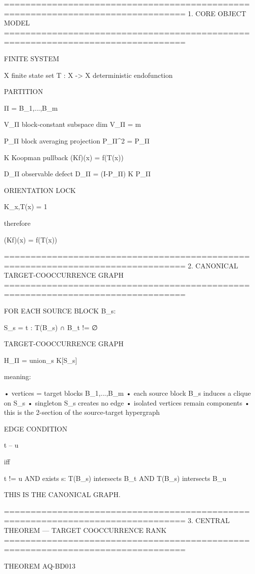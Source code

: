 ================================================================================
1. CORE OBJECT MODEL
================================================================================

FINITE SYSTEM

X                     finite state set
T : X -> X            deterministic endofunction

PARTITION

Π = {B_1,...,B_m}

V_Π                   block-constant subspace
dim V_Π = m

P_Π                   block averaging projection
P_Π^2 = P_Π

K                     Koopman pullback
(Kf)(x) = f(T(x))

D_Π                    observable defect
D_Π = (I-P_Π) K P_Π

ORIENTATION LOCK

K_{x,T(x)} = 1

therefore

(Kf)(x) = f(T(x))

================================================================================
2. CANONICAL TARGET-COOCCURRENCE GRAPH
================================================================================

FOR EACH SOURCE BLOCK B_s:

S_s = { t :
        T(B_s) ∩ B_t != ∅
      }

TARGET-COOCCURRENCE GRAPH

H_Π = union_s K[S_s]

meaning:

  • vertices = target blocks B_1,...,B_m
  • each source block B_s induces a clique on S_s
  • singleton S_s creates no edge
  • isolated vertices remain components
  • this is the 2-section of the source-target hypergraph

EDGE CONDITION

t -- u

iff

t != u
AND
exists s:
    T(B_s) intersects B_t
AND
    T(B_s) intersects B_u

THIS IS THE CANONICAL GRAPH.

================================================================================
3. CENTRAL THEOREM — TARGET COOCCURRENCE RANK
================================================================================

THEOREM AQ-BD013

